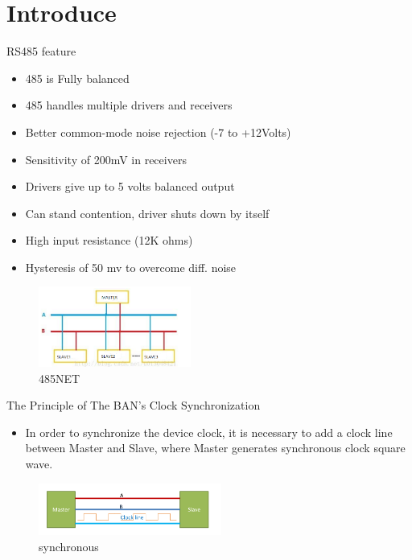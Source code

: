 \section{Introduce}

\begin{frame}[fragile]{ RS485 feature}

\begin{itemize}
\item  485 is  Fully balanced
\item 485 handles multiple drivers and receivers
\item Better common-mode noise rejection (-7 to +12Volts)
\item Sensitivity of 200mV in receivers
\item Drivers give up to 5 volts balanced output
\item Can stand contention, driver shuts down by itself
\item High input resistance (12K ohms)
\item Hysteresis of 50 mv to overcome diff. noise
\end{itemize}

\begin{figure}[htbp]
\begin{center}
\includegraphics[width=5cm]{img/485net}
\caption{485NET }
\label{Overview}
\end{center}
\vspace{-0.5em}
\end{figure}

\end{frame}


\begin{frame}[fragile]{The Principle of The BAN's Clock Synchronization}

\begin{itemize}
  \item In order to synchronize the device clock, it is necessary to add a clock line between Master and Slave, where Master generates synchronous clock square wave.
\end{itemize}

\begin{figure}[htbp]
\begin{center}
\includegraphics[width=6cm]{img/syncchart}
\caption{synchronous}
\label{Overview}
\end{center}
\vspace{-0.5em}
\end{figure}
\end{frame}


